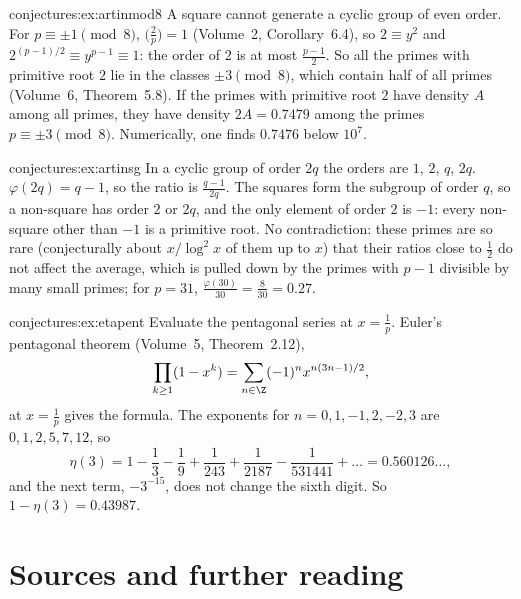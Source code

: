 \begin{solution}{conjectures:ex:artinmod8}
\idea A square cannot generate a cyclic group of even order.
\writeup For $p\equiv\pm1\pmod8$, $\bigl(\frac2p\bigr)=1$ (Volume~2, Corollary~6.4), so $2\equiv y^2$ and $2^{(p-1)/2}\equiv y^{p-1}\equiv1$: the order of $2$ is at most
$\frac{p-1}2$. So all the primes with primitive root $2$ lie in the classes $\pm3\pmod8$, which contain half of all primes (Volume~6, Theorem~5.8). If the
primes with primitive root $2$ have density $A$ among all primes, they have density $2A=0.7479$ among the primes $p\equiv\pm3\pmod8$. Numerically, one finds
$0.7476$ below $10^7$.
\end{solution}

\begin{solution}{conjectures:ex:artinsg}
\idea In a cyclic group of order $2q$ the orders are $1$, $2$, $q$, $2q$.
\writeup $\varphi(2q)=q-1$, so the ratio is $\frac{q-1}{2q}$. The squares form the subgroup of order $q$, so a non-square has order $2$ or $2q$, and the only
element of order $2$ is $-1$: every non-square other than $-1$ is a primitive root. No contradiction: these primes are so rare (conjecturally about
$x/\log^2x$ of them up to $x$) that their ratios close to $\frac12$ do not affect the average, which is pulled down by the primes with $p-1$ divisible by many
small primes; for $p=31$, $\frac{\varphi(30)}{30}=\frac8{30}=0.27$.
\end{solution}

\begin{solution}{conjectures:ex:etapent}
\idea Evaluate the pentagonal series at $x=\frac1p$.
\writeup Euler's pentagonal theorem (Volume~5, Theorem~2.12),
\[
\prod_{k\ge1}(1-x^k)=\sum_{n\in\Z}(-1)^nx^{n(3n-1)/2},
\]
at $x=\frac1p$ gives the formula. The exponents for
$n=0,1,-1,2,-2,3$ are $0,1,2,5,7,12$, so
\[
\eta(3)=1-\frac13-\frac19+\frac1{243}+\frac1{2187}-\frac1{531441}+\dots=0.560126\ldots,
\]
and the next term, $-3^{-15}$, does not change the sixth digit. So $1-\eta(3)=0.43987$.
\end{solution}

\section*{Sources and further reading}

